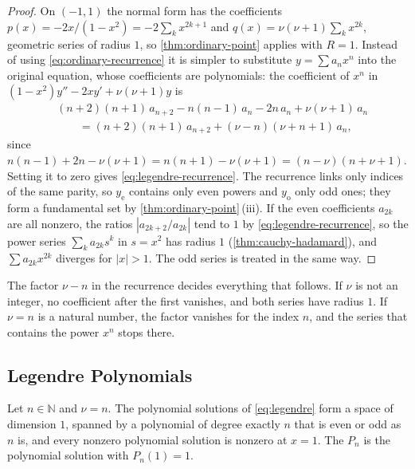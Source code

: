 \begin{proof}
On $(-1,1)$ the normal form has the coefficients $p(x)=-2x/(1-x^2)=-2\sum_kx^{2k+1}$ and $q(x)=\nu(\nu+1)\sum_kx^{2k}$, geometric series of radius $1$, so \cref{thm:ordinary-point} applies with $R=1$. Instead of using \eqref{eq:ordinary-recurrence} it is simpler to substitute $y=\sum a_nx^n$ into the original equation, whose coefficients are polynomials: the coefficient of $x^n$ in $(1-x^2)y''-2xy'+\nu(\nu+1)y$ is
\begin{align*}
&(n+2)(n+1)\,a_{n+2}-n(n-1)\,a_n-2n\,a_n+\nu(\nu+1)\,a_n\\
&\qquad=(n+2)(n+1)\,a_{n+2}+(\nu-n)(\nu+n+1)\,a_n ,
\end{align*}
since $n(n-1)+2n-\nu(\nu+1)=n(n+1)-\nu(\nu+1)=(n-\nu)(n+\nu+1)$. Setting it to zero gives \eqref{eq:legendre-recurrence}. The recurrence links only indices of the same parity, so $y_{\mathrm e}$ contains only even powers and $y_{\mathrm o}$ only odd ones; they form a fundamental set by \cref{thm:ordinary-point}\,(iii). If the even coefficients $a_{2k}$ are all nonzero, the ratios $|a_{2k+2}/a_{2k}|$ tend to $1$ by \eqref{eq:legendre-recurrence}, so the power series $\sum_ka_{2k}s^k$ in $s=x^2$ has radius $1$ (\cref{thm:cauchy-hadamard}), and $\sum a_{2k}x^{2k}$ diverges for $|x|>1$. The odd series is treated in the same way.
\end{proof}

The factor $\nu-n$ in the recurrence decides everything that follows. If $\nu$ is not an integer, no coefficient after the first vanishes, and both series have radius $1$. If $\nu=n$ is a natural number, the factor vanishes for the index $n$, and the series that contains the power $x^n$ stops there.

\subsection{Legendre Polynomials}

\begin{theorem}
\label{thm:legendre-polynomials}
Let $n\in\mathbb N$ and $\nu=n$. The polynomial solutions of \eqref{eq:legendre} form a space of dimension $1$, spanned by a polynomial of degree exactly $n$ that is even or odd as $n$ is, and every nonzero polynomial solution is nonzero at $x=1$. The  $P_n$ is the polynomial solution with $P_n(1)=1$.
\end{theorem}

